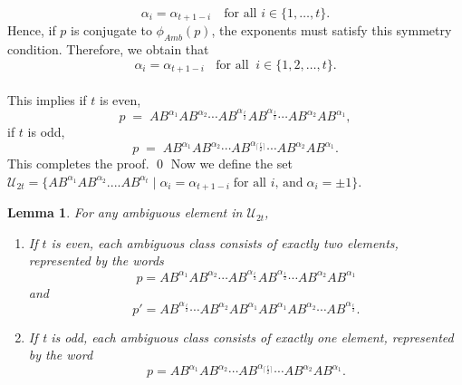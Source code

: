 \documentclass[a4paper,12pt]{amsart}
\renewenvironment{proof}{{\bfseries Proof.}}{\qed}
\numberwithin{equation}{section}
\newtheorem{lemma}[theorem]{Lemma}
\theoremstyle{definition}
\newcommand{\n}{\newline}
\numberwithin{equation}{section}
\begin{document}
\begin{proof}
\[
 \alpha_i=\alpha_{t+1-i}  \quad \text{for all } i\in \{1,\dots,t\}.
\]
Hence, if $p$ is conjugate to $\phi_{Amb}(p)$, the exponents must satisfy this symmetry condition.
 Therefore, we obtain that $$ \alpha_i=\alpha_{t+1-i} \;\;\text{ for all } ~i\in\{1,2,\dots,t\}.$$\\ This implies if $t$ is even,
     \[
    p \;=\;
    AB^{\alpha_1}AB^{\alpha_2}\cdots AB^{\alpha_{\frac{t}{2}}}AB^{\alpha_{\frac{t}{2}}}\cdots AB^{\alpha_2}AB^{\alpha_1} ,
    \]
    if $t$ is odd, 
     \[
    p \;=\;
    AB^{\alpha_1}AB^{\alpha_2}\cdots AB^{\alpha_{\lceil \frac{t}{2}\rceil}}\cdots AB^{\alpha_2}AB^{\alpha_1}.
    \] 
    This completes the proof. 
\end{proof}
 \vspace{2em}
 \n 
 Now we define the set $\mathcal{U}_{2t}=\{ AB^{\alpha_1}AB^{\alpha_2}....AB^{\alpha_{t}} \mid \alpha_i= \alpha_{t+1-i} \; \text{for all $i$, and} \; \alpha_i=\pm1\}.$
\begin{lemma}\label{3.2}
    For any ambiguous element in \;$\mathcal{U}_{2t}$,
    \begin{enumerate}
        \item If $t$ is even, each ambiguous class consists of exactly two elements, represented by the words $$p=AB^{\alpha_1}AB^{\alpha_2}\cdots AB^{\alpha_{\frac{t}{2}}}AB^{\alpha_\frac{t}{2}}\cdots AB^{\alpha_2}AB^{\alpha_1}$$ and $$p'=AB^{\alpha_{\frac{t}{2}}}\cdots AB^{\alpha_{2}}AB^{\alpha_1}AB^{\alpha_1}AB^{\alpha_2}\cdots AB^{\alpha_{\frac{t}{2}}}.$$
        \item If t is odd, each ambiguous class consists of exactly one element, represented by the word $$p=AB^{\alpha_1}AB^{\alpha_2}\cdots AB^{\alpha_{\lceil \frac{t}{2}\rceil}}\cdots AB^{\alpha_2}AB^{\alpha_1}.$$
        \end{enumerate}
\end{lemma}
\end{document}
